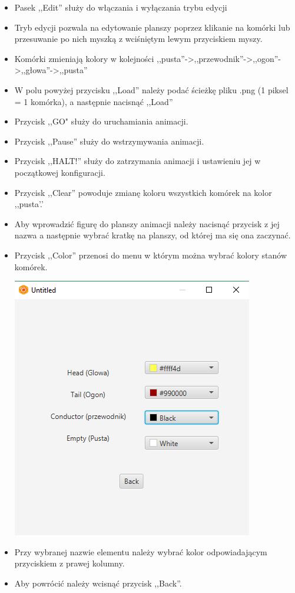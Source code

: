 \documentclass[a4paper,11pt]{article}
\begin{document}
\begin{itemize}
\item Pasek ,,Edit''  służy do włączania i wyłączania trybu edycji
\item Tryb edycji pozwala na edytowanie planszy poprzez klikanie na komórki lub przesuwanie po nich myszką z wciśniętym lewym przyciskiem myszy.
\item Komórki zmieniają kolory w kolejności ,,pusta''->,,przewodnik''->,,ogon''->,,głowa''->,,pusta''
\item W polu powyżej przycisku ,,Load'' należy podać ścieżkę pliku .png (1 piksel = 1 komórka), a następnie nacisnąć ,,Load''
\item Przycisk ,,GO" służy do uruchamiania animacji.
\item Przycisk ,,Pause'' służy do wstrzymywania animacji.
\item Przycisk ,,HALT!'' służy do zatrzymania animacji i ustawieniu jej w początkowej konfiguracji.
\item Przycisk ,,Clear'' powoduje zmianę koloru wszystkich komórek na kolor ,,pusta'.'
\item Aby wprowadzić figurę do planszy animacji należy nacisnąć przycisk z jej nazwa a następnie wybrać kratkę na planszy, od której ma się ona zaczynać.
\item Przycisk ,,Color'' przenosi do menu w którym można wybrać kolory stanów komórek.

\includegraphics[width=\textwidth]{GUI_WireWorld_2}

\item Przy wybranej nazwie elementu należy wybrać kolor odpowiadającym przyciskiem z prawej kolumny.
\item Aby powrócić należy wcisnąć przycisk ,,Back''.

\end{itemize}
\end{document}
